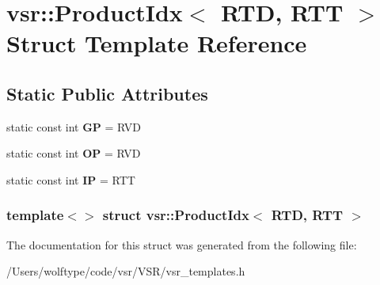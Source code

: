 \hypertarget{structvsr_1_1_product_idx_3_01_r_t_d_00_01_r_t_t_01_4}{\section{vsr\-:\-:Product\-Idx$<$ R\-T\-D, R\-T\-T $>$ Struct Template Reference}
\label{structvsr_1_1_product_idx_3_01_r_t_d_00_01_r_t_t_01_4}
}
\subsection*{Static Public Attributes}
\begin{DoxyCompactItemize}
\item 
\hypertarget{structvsr_1_1_product_idx_3_01_r_t_d_00_01_r_t_t_01_4_addb68bcaf1433e533f05d7da9fbb60f2}{static const int {\bfseries G\-P} = R\-V\-D}\label{structvsr_1_1_product_idx_3_01_r_t_d_00_01_r_t_t_01_4_addb68bcaf1433e533f05d7da9fbb60f2}

\item 
\hypertarget{structvsr_1_1_product_idx_3_01_r_t_d_00_01_r_t_t_01_4_a0dd71d34e8c0bd082aa2392d46e5e2bc}{static const int {\bfseries O\-P} = R\-V\-D}\label{structvsr_1_1_product_idx_3_01_r_t_d_00_01_r_t_t_01_4_a0dd71d34e8c0bd082aa2392d46e5e2bc}

\item 
\hypertarget{structvsr_1_1_product_idx_3_01_r_t_d_00_01_r_t_t_01_4_ad8b28545fae75ad2ead4b66930fdc6fd}{static const int {\bfseries I\-P} = R\-T\-T}\label{structvsr_1_1_product_idx_3_01_r_t_d_00_01_r_t_t_01_4_ad8b28545fae75ad2ead4b66930fdc6fd}

\end{DoxyCompactItemize}
\subsubsection*{template$<$$>$ struct vsr\-::\-Product\-Idx$<$ R\-T\-D, R\-T\-T $>$}



The documentation for this struct was generated from the following file\-:\begin{DoxyCompactItemize}
\item 
/\-Users/wolftype/code/vsr/\-V\-S\-R/vsr\-\_\-templates.\-h\end{DoxyCompactItemize}
